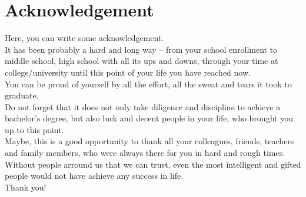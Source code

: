 \chapter*{Acknowledgement}

\noindent Here, you can write some acknowledgement. \\

\noindent It has been probably a hard and long way -- from your school enrollment to middle school, high school with all its ups and downs, through your time at college/university until this point of your life you have reached now. \\ 

\noindent You can be proud of yourself by all the effort, all the sweat and tears it took to graduate. \\

Do not forget that it does not only take diligence and discipline to achieve a bachelor's degree, but also luck and decent people in your life, who brought you up to this point. \\
\noindent Maybe, this is a good opportunity to thank all your colleagues, friends, teachers and family members, who were always there for you in hard and rough times.
Without people arround us that we can trust, even the most intelligent and gifted people would not have achieve any success in life. \\
\noindent Thank you!

